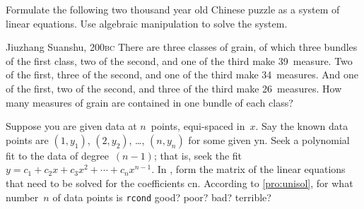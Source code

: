 \begin{exercise} \label{ex:} 
Formulate the following two thousand year old Chinese puzzle as a system of linear equations.
Use algebraic manipulation to solve the system.
\begin{quoted}{Jiuzhang Suanshu, 200\textsc{bc} \cite[p.3]{Chartier2015}}
There are three classes of grain, of which three bundles of the first class, two of the second, and one of the third make 39~measure.
Two of the first, three of the second, and one of the third make 34~measures.
And one of the first, two of the second, and three of the third make 26~measures.
How many measures of grain are contained in one bundle of each class?
\end{quoted}
\end{exercise}



\begin{comment}
Could have project exercises to introduce sensitivity to small errors in applications (experimental computational maths).  
Although sensitivity is quantified in the section on condition number and rank.
\end{comment}





\begin{exercise} \label{ex:} 
Suppose you are given data at \(n\)~points, equi-spaced in~\(x\).
Say the known data points are \((1,y_1)\), \((2,y_2)\), \ldots, \((n,y_n)\) for some given \hlist yn.
Seek a polynomial fit to the data of degree~\((n-1)\); that is, seek the fit \(y=c_1+c_2x+c_3x^2+\cdots+c_{n}x^{n-1}\).
In \script, form the matrix of the linear equations that need to be solved for the coefficients \hlist cn.  
According to \autoref{pro:unisol}, for what number~\(n\) of data points is \verb|rcond| good? poor? bad? terrible? 
\end{exercise}




